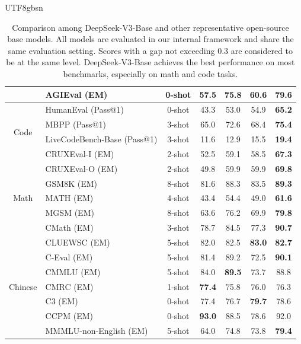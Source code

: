 \documentclass[11pt, a4paper, logo, copyright, nonumbering]{deepseek}
\newcommand{\dsviii}{DeepSeek-V3}
\begin{document}
\begin{CJK*}{UTF8}{gbsn}
\begin{table}[!h]
\begin{tabular}{@{}c l c | c | c c | c@{}}
    & AGIEval {\tiny (EM)} & 0-shot & 57.5 & 75.8 & 60.6 & \textbf{79.6} \\
    \midrule
    \multirow{4}{*}{Code} & HumanEval {\tiny (Pass@1)} & 0-shot & 43.3 & 53.0 & 54.9 & \textbf{65.2} \\
    & MBPP {\tiny (Pass@1)} & 3-shot & 65.0 & 72.6 & 68.4 & \textbf{75.4} \\
    & LiveCodeBench-Base {\tiny (Pass@1)} & 3-shot & 11.6 & 12.9 & 15.5 & \textbf{19.4} \\
    & CRUXEval-I {\tiny (EM)} & 2-shot & 52.5 & 59.1 & 58.5 & \textbf{67.3} \\
    & CRUXEval-O {\tiny (EM)} & 2-shot & 49.8 & 59.9 & 59.9 & \textbf{69.8} \\
    \midrule
    \multirow{3}{*}{Math} & GSM8K {\tiny (EM)} & 8-shot & 81.6 & 88.3 & 83.5 & \textbf{89.3} \\
    & MATH {\tiny (EM)} & 4-shot & 43.4 & 54.4 & 49.0 & \textbf{61.6} \\
    & MGSM {\tiny (EM)} & 8-shot & 63.6 & 76.2 & 69.9 & \textbf{79.8} \\
    & CMath {\tiny (EM)} & 3-shot & 78.7 & 84.5 & 77.3 & \textbf{90.7} \\
    \midrule
    \multirow{7}{*}{Chinese} & CLUEWSC {\tiny (EM)} & 5-shot & 82.0 & 82.5 & \textbf{83.0} & \textbf{82.7} \\
    & C-Eval {\tiny (EM)} & 5-shot & 81.4 & 89.2 & 72.5 & \textbf{90.1} \\
    & CMMLU {\tiny (EM)} & 5-shot & 84.0 & \textbf{89.5} & 73.7 & 88.8 \\
    & CMRC {\tiny (EM)} & 1-shot & \textbf{77.4} & 75.8 & 76.0 & 76.3 \\
    & C3 {\tiny (EM)} & 0-shot & 77.4 & 76.7 & \textbf{79.7} & 78.6 \\
    & CCPM {\tiny (EM)} & 0-shot & \textbf{93.0} & 88.5 & 78.6 & 92.0 \\
    \midrule
    \multirow{1}{*}{Multilingual} & MMMLU-non-English {\tiny (EM)} & 5-shot & 64.0 & 74.8 & 73.8 & \textbf{79.4} \\
    \bottomrule
    \end{tabular}
    \caption{
        Comparison among \dsviii{}-Base and other representative open-source base models.
        All models are evaluated in our internal framework and share the same evaluation setting.
        Scores with a gap not exceeding 0.3 are considered to be at the same level. 
        \dsviii{}-Base achieves the best performance on most benchmarks, especially on math and code tasks. 
    }
    \label{tab:main}
\end{table}


\end{CJK*}
\end{document}

